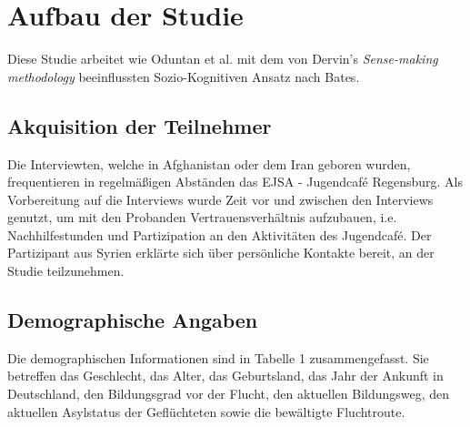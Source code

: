 \section{Aufbau der Studie}
Diese Studie arbeitet wie Oduntan et al.\cite{oduntan2017investigating} mit dem von Dervin's \textit{Sense-making methodology} beeinflussten Sozio-Kognitiven Ansatz nach Bates\cite{bates2005introduction}.

\subsection{Akquisition der Teilnehmer}
Die Interviewten, welche in Afghanistan oder dem Iran geboren wurden, frequentieren in regelmäßigen Abständen das EJSA - Jugendcafé Regensburg. Als Vorbereitung auf die Interviews wurde Zeit vor und zwischen den Interviews genutzt, um mit den Probanden Vertrauensverhältnis aufzubauen, i.e. Nachhilfestunden und Partizipation an den Aktivitäten des Jugendcafé.\newline
Der Partizipant aus Syrien erklärte sich über persönliche Kontakte bereit, an der Studie teilzunehmen.

\subsection{Demographische Angaben}

Die demographischen Informationen sind in Tabelle 1 zusammengefasst. Sie betreffen das Geschlecht, das Alter, das Geburtsland, das Jahr der Ankunft in Deutschland, den Bildungsgrad vor der Flucht, den aktuellen Bildungsweg, den aktuellen Asylstatus der Geflüchteten sowie die bewältigte Fluchtroute.

